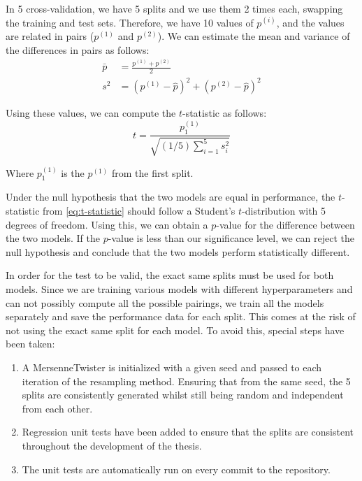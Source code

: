 In 5 cross-validation, we have 5 splits and we use them 2 times each,
swapping the training and test sets. Therefore, we have 10 values of $p^{(i)}$,
and the values are related in pairs ($p^{(1)}$ and $p^{(2)}$). We can estimate
the mean and variance of the differences in pairs as follows:
\begin{align}
    \bar{p} & = \frac{p^{(1)} + p^{(2)}}{2}                                         \\
    s^2     & = \left(p^{(1)} - \hat{p}\right)^2 + \left(p^{(2)} - \hat{p}\right)^2
\end{align}

Using these values, we can compute the $t$-statistic as follows:
\begin{equation}\label{eq:t-statistic}
    t = \frac{p_1^{(1)}}{\sqrt{(1/5)\sum_{i=1}^5 s_i^2}}
\end{equation}

Where $p_1^{(1)}$ is the $p^{(1)}$ from the first split.

Under the null hypothesis that the two models are equal in performance, the
$t$-statistic from \cref{eq:t-statistic} should follow a Student's
$t$-distribution with 5 degrees of freedom. Using this, we can obtain a
$p$-value for the difference between the two models. If the $p$-value is less
than our significance level, we can reject the null hypothesis and conclude
that the two models perform statistically different.

In order for the test to be valid, the exact same splits must be used for both
models. Since we are training various models with different hyperparameters
and can not possibly compute all the possible pairings, we train all the models
separately and save the performance data for each split.
This comes at the risk of not using the exact same split for each model. To avoid
this, special steps have been taken:

\begin{enumerate}
    \item A MersenneTwister is initialized with a given seed and passed to each
          iteration of the resampling method. Ensuring that from the same seed,
          the 5 splits are consistently generated whilst still being random and
          independent from each other.
    \item Regression unit tests have been added to ensure that the splits are
          consistent throughout the development of the thesis.
    \item The unit tests are automatically run on every commit to the repository.
\end{enumerate}

